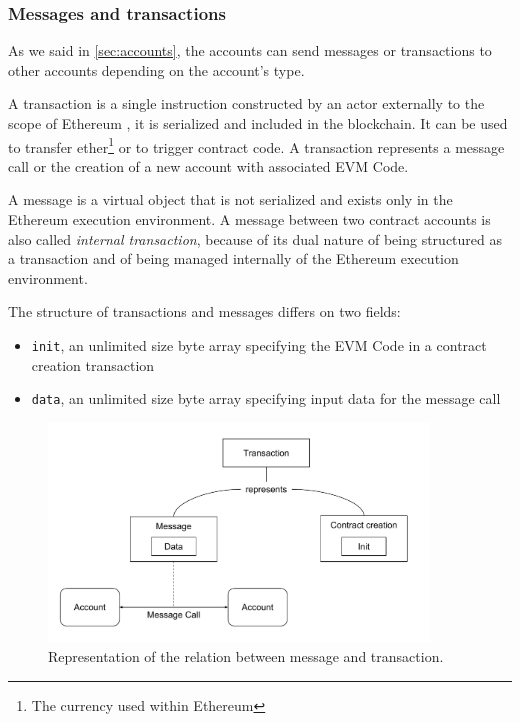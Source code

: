 \subsubsection{Messages and transactions}

As we said in \autoref{sec:accounts}, the accounts can send messages or
transactions to other accounts depending on the account's type.

A transaction is a single instruction constructed by an actor externally to the
scope of Ethereum \cite{wood2018ethereum}, it is serialized and included in the
blockchain. It can be used to transfer ether\footnote{The currency used within
Ethereum} or to trigger contract code. A transaction represents a message call
or the creation of a new account with associated EVM Code.

A message is a virtual object that is not serialized and exists only in the
Ethereum execution environment. A message between two contract accounts is also
called \emph{internal transaction}, because of its dual nature of being
structured as a transaction and of being managed internally of the Ethereum
execution environment.

The structure of transactions and messages differs on two fields:

\begin{itemize}
  \item \verb+init+, an unlimited size byte array specifying the EVM Code in a
  contract creation transaction
  \item \verb+data+, an unlimited size byte array specifying input data for the
  message call
\end{itemize}

\begin{figure}[h]
  \centering
  \includegraphics[width=0.9\textwidth]{./res/img/messages-transactions.pdf}
\caption{Representation of the relation between message and transaction.}
\label{fig:messages-transactions}
\end{figure}

